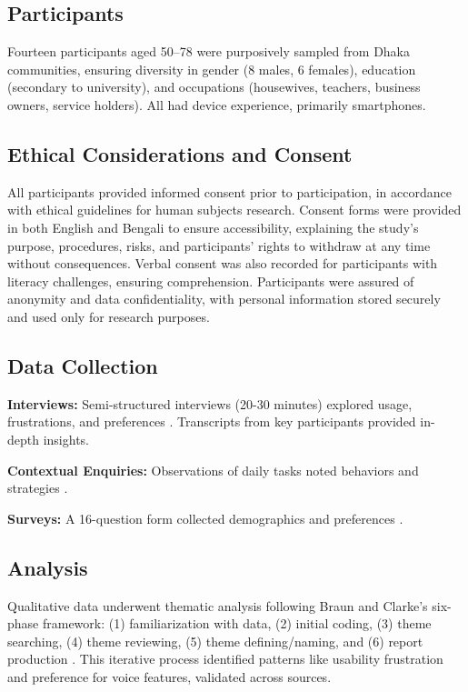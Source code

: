 \documentclass[acmlarge]{acmart}
\begin{document}
\subsection{Participants}
Fourteen participants aged 50–78 were purposively sampled from Dhaka communities, ensuring diversity in gender (8 males, 6 females), education (secondary to university), and occupations (housewives, teachers, business owners, service holders). All had device experience, primarily smartphones.

\subsection{Ethical Considerations and Consent}
All participants provided informed consent prior to participation, in accordance with ethical guidelines for human subjects research. Consent forms were provided in both English and Bengali to ensure accessibility, explaining the study's purpose, procedures, risks, and participants' rights to withdraw at any time without consequences. Verbal consent was also recorded for participants with literacy challenges, ensuring comprehension. Participants were assured of anonymity and data confidentiality, with personal information stored securely and used only for research purposes.

\subsection{Data Collection}
\textbf{Interviews:} Semi-structured interviews (20-30 minutes) explored usage, frustrations, and preferences \cite{creswell2014qualitative, patton2015qualitative}. Transcripts from key participants provided in-depth insights.

\textbf{Contextual Enquiries:} Observations of daily tasks noted behaviors and strategies \cite{beyer1997contextual, holtzblatt2014contextual}.

\textbf{Surveys:} A 16-question form collected demographics and preferences \cite{fowler2013survey, dillman2014internet}.

\subsection{Analysis}
Qualitative data underwent thematic analysis following Braun and Clarke's six-phase framework: (1) familiarization with data, (2) initial coding, (3) theme searching, (4) theme reviewing, (5) theme defining/naming, and (6) report production \cite{braun2006thematic}. This iterative process identified patterns like usability frustration and preference for voice features, validated across sources.
\end{document}
